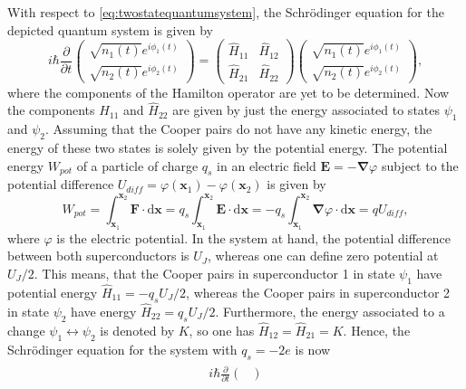 \documentclass{report}
\numberwithin{tm}{section}
\newcommand\vect[1]{\ensuremath{\bm{#1}}}
\begin{document}
With respect to \cref{eq:twostatequantumsystem}, the Schrödinger equation for the depicted quantum system is given by \begin{equation}
i\hbar\frac{\partial}{\partial t}\begin{pmatrix}
	\sqrt{n_1(t)}e^{i\phi_1(t)} \\ \sqrt{n_2(t)}e^{i\phi_2(t)}
\end{pmatrix} = \begin{pmatrix}
	\hat{H}_{11} & \hat{H}_{12} \\
	\hat{H}_{21} & \hat{H}_{22}
\end{pmatrix}\begin{pmatrix}
	\sqrt{n_1(t)}e^{i\phi_1(t)} \\ \sqrt{n_2(t)}e^{i\phi_2(t)}
\end{pmatrix},
\end{equation} where the components of the Hamilton operator are yet to be determined. Now the components $\hat{H}_{11}$ and $\hat{H}_{22}$ are given by just the energy associated to states $\psi_1$ and $\psi_2$. Assuming that the Cooper pairs do not have any kinetic energy, the energy of these two states is solely given by the potential energy. The potential energy $W_{pot}$ of a particle of charge $q_s$ in an electric field $\vect{E} = -\vect{\nabla}\varphi$ subject to the potential difference $U_{diff} = \varphi(\vect{x}_1) -\varphi(\vect{x}_2)$ is given by \begin{equation}
W_{pot} = \int_{\vect{x}_1}^{\vect{x}_2}\vect{F}\cdot \mathrm{d}\vect{x} = q_s\int_{\vect{x}_1}^{\vect{x}_2}\vect{E}\cdot\mathrm{d}\vect{x} = -q_s\int_{\vect{x}_1}^{\vect{x}_2}\vect{\nabla}\varphi\cdot\mathrm{d}\vect{x} = qU_{diff},
\end{equation} where $\varphi$ is the electric potential. In the system at hand, the potential difference between both superconductors is $U_J$, whereas one can define zero potential at $U_J/2$. This means, that the Cooper pairs in superconductor 1 in state $\psi_1$ have potential energy $\hat{H}_{11} = -q_sU_J/2$, whereas the Cooper pairs in superconductor 2 in state $\psi_2$ have energy $\hat{H}_{22}= q_sU_J/2$. Furthermore, the energy associated to a change $\psi_1 \leftrightarrow \psi_2$ is denoted by $K$, so one has $\hat{H}_{12} = \hat{H}_{21} = K$. Hence, the Schrödinger equation for the system with $q_s = -2e$ is now \begin{align}\begin{aligned}\label{eq:josephson_schroedinger_equation}
i\hbar\frac{\partial}{\partial t}\begin{pmatrix}

\end{pmatrix}
\end{aligned}
\end{align}
\end{document}
